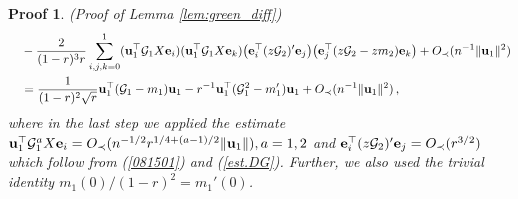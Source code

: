 \documentclass[12pt]{article}
\numberwithin{equation}{section}
\newtheorem{myPro}{Proof}
\theoremstyle{remark}
\newcommand{\1}{{\rm 1}\kern-0.24em{\rm I}}
\begin{document}
\begin{appendices}
\begin{myPro}{(Proof of Lemma \ref{lem:green_diff})}
{\begin{align}
&\quad -
\frac{2}{(1-r)^3r}\sum_{i,j,k=0}^1  ({\bf u}_1^{\top}\mathcal{G}_1{X}{\bf e}_i) ({\bf u}_1^{\top}\mathcal{G}_1{X}{\bf e}_k) \big( {\bf e}_i^{\top}(z\mathcal{G}_2)'{\bf e}_j\big) \big({\bf e}_j^{\top}(z\mathcal{G}_2-zm_2){\bf e}_k\big) +O_\prec(n^{-1} \Vert {\bf u}_1 \Vert^2) \notag\\
&\quad = \frac{1}{(1-r)^2\sqrt r} {\bf u}_1^{\top}(\mathcal{G}_1-m_1){\bf u}_1 -r^{-1} {\bf u}_1^{\top}(\mathcal{G}_1^2- m_1'){\bf u}_1 +O_\prec(n^{-1}\Vert {\bf u}_1 \Vert^2)\,,
\end{align}
}
where in the last step we applied the estimate ${\bf u}_1^{\top}\mathcal{G}_1^a{X}{\bf e}_i = O_\prec(n^{-1/2}r^{1/4+(a-1)/2}\Vert {\bf u}_1\Vert), a=1,2$ and  ${\bf e}_i^{\top}(z\mathcal{G}_2)'{\bf e}_j = O_\prec(r^{3/2})$ which follow from (\ref{081501}) and (\ref{est.DG}). Further, we also used the trivial identity $m_1(0)/(1-r)^2= m_1'(0)$. 


\end{myPro}
\end{appendices}
\end{document}
